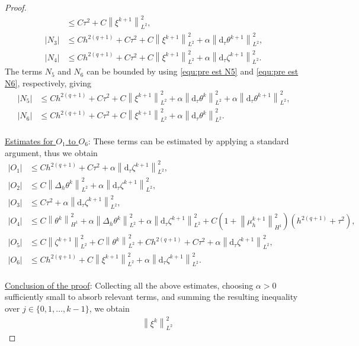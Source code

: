 \documentclass[11pt, reqno]{amsart}
\theoremstyle{definition}
\numberwithin{equation}{section}
\newcommand{\dtt}{\mathrm{d}_\tau}
\newcommand{\norm}[2]{\left\|{#1}\right\|_{#2}}
\newcommand{\abs}[1]{\left|{#1}\right|}
\begin{document}
\begin{proof}
\begin{align*}
    &\leq
    C\tau^2 + C\norm{\xi^{k+1}}{L^2}^2,
    \\
    \abs{N_3}
    &\leq
    Ch^{2(q+1)}+ C\tau^2 + C\norm{\xi^{k+1}}{L^2}^2 + \alpha \norm{\dtt \theta^{k+1}}{L^2}^2,
    \\
    \abs{N_4}
    &\leq
    Ch^{2(q+1)} + C\tau^2 + C \norm{\xi^{k+1}}{L^2}^2 + \alpha \norm{\dtt \zeta^{k+1}}{L^2}^2.
\end{align*}
The terms $N_5$ and $N_6$ can be bounded by using \eqref{equ:pre est N5} and \eqref{equ:pre est N6}, respectively, giving
\begin{align*}
    \abs{N_5}
    &\leq
    Ch^{2(q+1)} + C\tau^2 + C \norm{\xi^{k+1}}{L^2}^2 + \alpha \norm{\dtt \theta^k}{L^2}^2+ \alpha \norm{\dtt \theta^{k+1}}{L^2}^2,
    \\
    \abs{N_6}
    &\leq
    Ch^{2(q+1)}+ C\tau^2 + C\norm{\xi^{k+1}}{L^2}^2 + \alpha \norm{\dtt \theta^k}{L^2}^2.
\end{align*}
\\
\underline{Estimates for $O_1$ to $O_6$}: These terms can be estimated by applying a standard argument, thus we obtain
\begin{align*}
    \abs{O_1}
    &\leq
    Ch^{2(q+1)} + C\tau^2 + \alpha \norm{\dtt \zeta^{k+1}}{L^2}^2,
    \\
    \abs{O_2}
    &\leq
    C\norm{\Delta_h \theta^k}{L^2}^2
    +
    \alpha \norm{\dtt \zeta^{k+1}}{L^2}^2,
    \\
    \abs{O_3}
    &\leq
    C\tau^2 + \alpha \norm{\dtt \zeta^{k+1}}{L^2}^2,
    \\
    \abs{O_4}
    &\leq
    C\norm{\theta^k}{H^1}^2 + \alpha \norm{\Delta_h \theta^k}{L^2}^2
    +
    \alpha \norm{\dtt \zeta^{k+1}}{L^2}^2
    +
    C\left(1+\norm{\mu_h^{k+1}}{H^1}^2\right) (h^{2(q+1)}+ \tau^2),
    \\
    \abs{O_5}
    &\leq
    C\norm{\zeta^{k+1}}{L^2}^2
    +
    C\norm{\theta^k}{L^2}^2
    +
    Ch^{2(q+1)} + C\tau^2
    +
    \alpha \norm{\dtt \zeta^{k+1}}{L^2}^2,
    \\
    \abs{O_6}
    &\leq
    Ch^{2(q+1)}
    +
    C\norm{\xi^{k+1}}{L^2}^2
    +
    \alpha \norm{\dtt \zeta^{k+1}}{L^2}^2.
\end{align*}
\\
\underline{Conclusion of the proof}: Collecting all the above estimates, choosing $\alpha>0$ sufficiently small to absorb relevant terms, and summing the resulting inequality over $j\in \{0,1,\ldots,k-1\}$, we obtain
\begin{align*}
    &\norm{\xi^k}{L^2}^2

\end{align*}
\end{proof}
\end{document}
